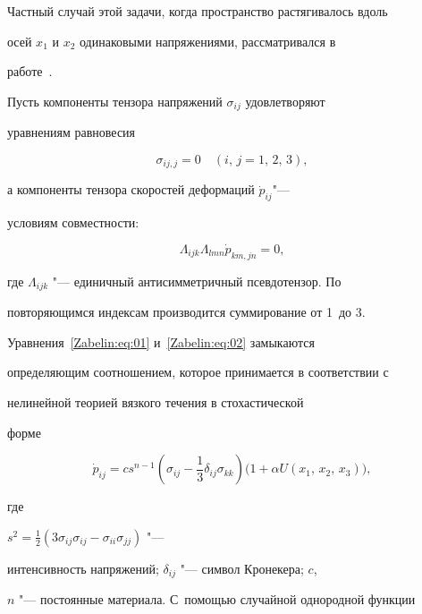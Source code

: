 Частный случай этой задачи, когда пространство растягивалось вдоль

осей $x_1$ и $x_2$ одинаковыми напряжениями, рассматривался в

работе~\cite{Zabelin:bib:06}.



Пусть компоненты тензора напряжений $\sigma_{ij}$ удовлетворяют

уравнениям равновесия

\begin{equation}\label{Zabelin:eq:01}

\sigma_{ij,j}=0\quad(i,\,j=1,\,2,\,3),

\end{equation}

а компоненты тензора скоростей деформаций $\dot{p}_{ij}$"---

условиям совместности:

\begin{equation}\label{Zabelin:eq:02}

\Lambda_{ijk}\Lambda_{lmn}\dot{p}_{km,jn}=0,

\end{equation}

где $\Lambda_{ijk}$ "--- единичный антисимметричный псевдотензор. По

повторяющимся индексам производится суммирование от 1~до 3.



Уравнения~\eqref{Zabelin:eq:01} и~\eqref{Zabelin:eq:02} замыкаются

определяющим соотношением, которое принимается в соответствии с

нелинейной теорией вязкого течения в стохастической

форме~\cite{Zabelin:bib:06}

\begin{equation}\label{Zabelin:eq:03}

\dot{p}_{ij}=cs^{n-1}\left(\sigma_{ij}-\frac13\delta_{ij}\sigma_{kk}\right)\big(1+\alpha

U(x_1,\, x_2,\, x_3)\big),

\end{equation}

где

$s^2=\frac12(3\sigma_{ij}\sigma_{ij}-\sigma_{ii}\sigma_{jj})$ "---

интенсивность напряжений; $\delta_{ij}$ "--- символ Кронекера; $c$,

$n$ "--- постоянные материала. С~помощью случайной однородной функции

